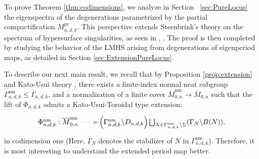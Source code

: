 \documentclass[12pt, letterpaper]{amsart}
\theoremstyle{plain}
\theoremstyle{definition}
\begin{document}
To prove Theorem \ref{thm:codimensions}, we analyze in Section ~\ref{sec:PureLocus} the eigenspectra of the degenerations parametrized by the partial compactification $M_{n,d,k}^{\mathrm{pr}}$. This perspective extends Steenbrink's theory on the spectrum of hypersurface singularities, as seen in \cite{KL20}, \cite{castor2022remarks}. The proof is then completed by studying  the behavior of the LMHS arising from degenerations of eigenperiod maps, as detailed in Section
\ref{sec:ExtensionPureLocus}. 

To describe our next main result, we recall that by Proposition \ref{prop:extension} and Kato-Usui theory \cite{KU08},  there exists a finite-index normal neat subgroup $\Gamma^{\mathrm{nm}}_{n,d,k}\leq \Gamma_{n,d,k}$, and a normalization of a finite cover $\overline{M}^{\mathrm{nm}}_{0,n} \to \overline{M}_{0,n}$ such that the lift of $\Phi_{n,d,k}$ admits a Kato-Usui-Toroidal type extension:
\begin{align*}
    \xymatrix{
    \Phi^{\mathrm{nm}}_{n,d,k}:   \overline{M}^{\mathrm{nm}}_{0,n}
    \ar@{.>}[r]& 
    \left( \Gamma^{\mathrm{nm}}_{n,d,k}\backslash D_{n,d,k} \right) 
    \bigsqcup_{N\in \Gamma^{\mathrm{nm}}_{n,d,k}\backslash \Sigma}(\Gamma_N\backslash B(N)).
    }
\end{align*}
in codimension one (Here, $\Gamma_N$ denotes the stabilizer of $N$ in $\Gamma^{\mathrm{nm}}_{n,d,k}$). Therefore, it is most interesting to understand the extended period map better.
\end{document}
